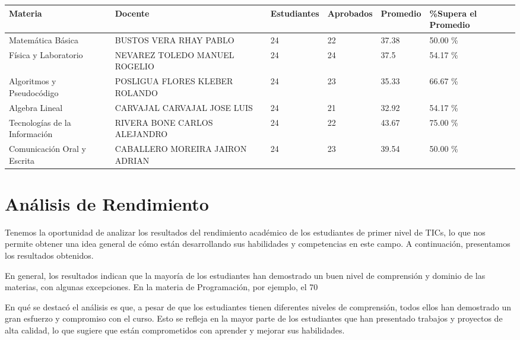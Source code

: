 \small
\begin{tabularx}{\textwidth}{|p{2.5cm}|p{2.5cm}|X|X|X|X|}
\hline
\textbf{Materia} & \textbf{Docente} & \textbf{Estudiantes} & \textbf{Aprobados} & \textbf{Promedio} & \textbf{\%Supera el Promedio} \\ \hline
Matemática Básica & BUSTOS VERA RHAY PABLO & 24 & 22 & 37.38 & 50.00 \%\\ \hline
Física y Laboratorio & NEVAREZ TOLEDO MANUEL ROGELIO & 24 & 24 & 37.5 & 54.17 \%\\ \hline
Algoritmos y Pseudocódigo & POSLIGUA FLORES KLEBER ROLANDO & 24 & 23 & 35.33 & 66.67 \%\\ \hline
Algebra Lineal & CARVAJAL CARVAJAL JOSE LUIS & 24 & 21 & 32.92 & 54.17 \%\\ \hline
Tecnologías de la Información  & RIVERA BONE CARLOS ALEJANDRO & 24 & 22 & 43.67 & 75.00 \%\\ \hline
Comunicación Oral y Escrita & CABALLERO MOREIRA JAIRON ADRIAN & 24 & 23 & 39.54 & 50.00 \%\\ \hline
\end{tabularx}

\vspace{1cm}
\section{Análisis de Rendimiento}
Tenemos la oportunidad de analizar los resultados del rendimiento académico de los estudiantes de primer nivel de TICs, lo que nos permite obtener una idea general de cómo están desarrollando sus habilidades y competencias en este campo. A continuación, presentamos los resultados obtenidos.

En general, los resultados indican que la mayoría de los estudiantes han demostrado un buen nivel de comprensión y dominio de las materias, con algunas excepciones. En la materia de Programación, por ejemplo, el 70%

En qué se destacó el análisis es que, a pesar de que los estudiantes tienen diferentes niveles de comprensión, todos ellos han demostrado un gran esfuerzo y compromiso con el curso. Esto se refleja en la mayor parte de los estudiantes que han presentado trabajos y proyectos de alta calidad, lo que sugiere que están comprometidos con aprender y mejorar sus habilidades.

